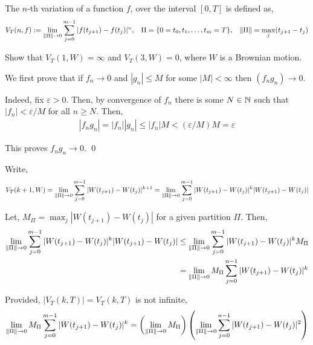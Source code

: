 \begin{problem}[Exercise 7.3]
    The \( n \)-th variation of a function \( f \), over the interval \( [0,T] \) is defined as,
    \begin{align*}
        V_T(n,f) := 
        \lim_{\left\lVert\Pi\right\rVert\to 0} \sum_{j=0}^{m-1} |f(t_{j+1})-f(t_j)|^n, && \Pi = \{0=t_0,t_1, \ldots, t_m=T\}, && \left\lVert\Pi\right\rVert = \max_j(t_{j+1}-t_{j})
    \end{align*}

    Show that \( V_T(1,W) = \infty \) and \( V_T(3,W) = 0 \), where \( W \) is a Brownian motion.
\end{problem}


\begin{solution}[Solution]
We first prove that if \( f_n \to 0 \) and \( |g_n| \leq M \) for some \( |M| < \infty \) then \( (f_ng_n)\to 0 \).

Indeed, fix \( \varepsilon > 0 \). Then, by convergence of \( f_n \) there is some \( N\in\mathbb{N} \) such that \( |f_n| < \varepsilon/M \) for all \( n\geq N \). Then,
\begin{align*}
    |f_ng_n| = |f_n||g_n| \leq |f_n|M < (\varepsilon/M)M = \varepsilon
\end{align*}

This proves \( f_ng_n \to 0 \). \qed


Write,
\begin{align*}
    V_T(k+1,W) = 
    \lim_{\left\lVert\Pi\right\rVert\to 0} \sum_{j=0}^{m-1} |W(t_{j+1})-W(t_j)|^{k+1} = 
    \lim_{\left\lVert\Pi\right\rVert\to 0} \sum_{j=0}^{m-1} |W(t_{j+1})-W(t_j)|^k|W(t_{j+1})-W(t_j)|
\end{align*}

Let, \( M_\Pi = \max_j |W(t_{j+1}) - W(t_j)| \) for a given partition \( \Pi \). Then,
\begin{align*}
    \lim_{\left\lVert\Pi\right\rVert\to 0} \sum_{j=0}^{m-1} |W(t_{j+1})-W(t_j)|^k|W(t_{j+1})-W(t_j)| 
    &\leq \lim_{\left\lVert\Pi\right\rVert\to 0} \sum_{j=0}^{m-1} |W(t_{j+1})-W(t_j)|^k M_\Pi 
    \\&= \lim_{\left\lVert\Pi\right\rVert\to 0} M_\Pi \sum_{j=0}^{n-1} |W(t_{j+1})-W(t_j)|^k
\end{align*}

Provided, \( |V_T(k,T)| = V_T(k,T) \) is not infinite,
\begin{align*}
    \lim_{\left\lVert\Pi\right\rVert\to 0} M_\Pi \sum_{j=0}^{m-1} |W(t_{j+1})-W(t_j)|^k
    = \left( \lim_{\left\lVert\Pi\right\rVert\to 0} M_\Pi \right) \left( \lim_{\left\lVert\Pi\right\rVert\to 0} \sum_{j=0}^{n-1} |W(t_{j+1})-W(t_j)|^2 \right)
\end{align*}


\end{solution}
